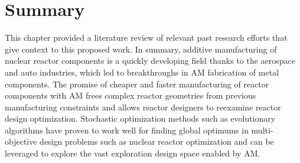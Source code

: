 \section{Summary}
This chapter provided a literature review of relevant past research 
efforts that give context to this proposed work.
In summary, additive manufacturing of nuclear reactor components is a quickly 
developing field thanks to the aerospace and auto industries, which led to 
breakthroughs in \gls{AM} fabrication of metal components. 
The promise of cheaper and faster manufacturing of reactor components with 
\gls{AM} frees complex reactor geometries from previous manufacturing constraints
and allows reactor designers to reexamine reactor design optimization.  
Stochastic optimization methods such as evolutionary algorithms have proven to 
work well for finding global optimums in multi-objective design problems such as 
nuclear reactor optimization and can be leveraged to explore the vast exploration 
design space enabled by \gls{AM}.